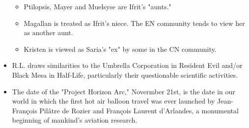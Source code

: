 \documentclass[12pt]{article}
\begin{document}
\begin{multicols}{2}
\begin{itemize}
\begin{itemize}
        \item Ptilopsis, Mayer and Muelsyse are Ifrit's "aunts."
        \item Magallan is treated as Ifrit's niece. The EN community tends to view her as another aunt.
        \item Kristen is viewed as Saria's "ex" by some in the CN community.
    \end{itemize}
    \item R.L. draws similarities to the Umbrella Corporation in Resident Evil and/or Black Mesa in Half-Life, particularly their questionable scientific activities.
    \item The date of the "Project Horizon Arc," Novermber 21st, is the date in our world in which the first hot air balloon travel was ever launched by Jean-François Pilâtre de Rozier and François Laurent d'Arlandes, a monumental beginning of mankind's aviation research\cite{9}.
\end{itemize}

\lipsum[]

\raggedright\printbibliography[heading=bibintoc]

\end{multicols}
\end{document}
